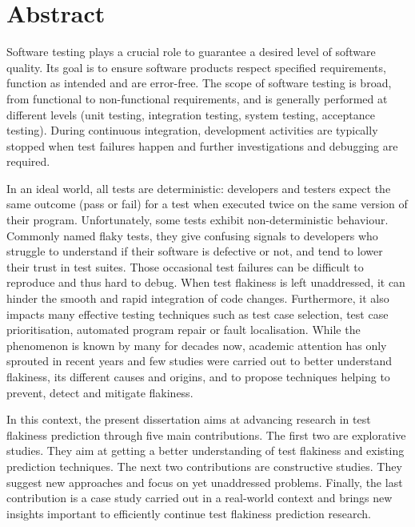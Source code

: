\chapter*{Abstract}

Software testing plays a crucial role to guarantee a desired level of software quality. Its goal is to ensure software products respect specified requirements, function as intended and are error-free. The scope of software testing is broad, from functional to non-functional requirements, and is generally performed at different levels (\eg unit testing, integration testing, system testing, acceptance testing). During continuous integration, development activities are typically stopped when test failures happen and further investigations and debugging are required.

In an ideal world, all tests are deterministic: developers and testers expect the same outcome (pass or fail) for a test when executed twice on the same version of their program. Unfortunately, some tests exhibit non-deterministic behaviour. Commonly named flaky tests, they give confusing signals to developers who struggle to understand if their software is defective or not, and tend to lower their trust in test suites. Those occasional test failures can be difficult to reproduce and thus hard to debug. When test flakiness is left unaddressed, it can hinder the smooth and rapid integration of code changes. Furthermore, it also impacts many effective testing techniques such as test case selection, test case prioritisation, automated program repair or fault localisation. While the phenomenon is known by many for decades now, academic attention has only sprouted in recent years and few studies were carried out to better understand flakiness, its different causes and origins, and to propose techniques helping to prevent, detect and mitigate flakiness. 

In this context, the present dissertation aims at advancing research in test flakiness prediction through five main contributions. The first two are explorative studies. They aim at getting a better understanding of test flakiness and existing prediction techniques. The next two contributions are constructive studies. They suggest new approaches and focus on yet unaddressed problems. Finally, the last contribution is a case study carried out in a real-world context and brings new insights important to efficiently continue test flakiness prediction research. 

